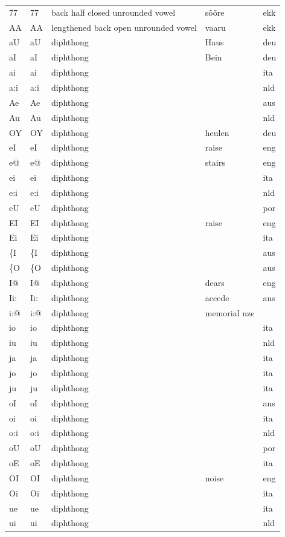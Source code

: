 \documentclass[twoside,a4paper]{book}
\begin{document}
\begin{longtable}{lllll}
	77 & 77 & back half closed unrounded vowel & sõõre & ekk\\
	AA & AA & lengthened back open unrounded vowel & vaaru & ekk\\
	aU & aU & diphthong & Haus & deu\\
	aI & aI & diphthong & Bein & deu\\
	ai & ai & diphthong & & ita\\
	a:i & a:i & diphthong & & nld\\
	Ae & Ae & diphthong & & aus\\
	Au & Au & diphthong & & nld\\
	OY & OY & diphthong & heulen & deu\\
	eI & eI & diphthong & raise & eng\\
	e@ & e@ & diphthong & stairs & eng\\
	ei & ei & diphthong & & ita\\
	e:i & e:i & diphthong & & nld\\
	eU & eU & diphthong & & por\\
	EI & EI & diphthong & raise & eng\\
	Ei & Ei & diphthong & & ita\\
	\{I & \{I & diphthong & & aus\\
	\{O & \{O & diphthong & & aus\\
	I@ & I@ & diphthong & dears & eng\\
	Ii: & Ii: & diphthong & accede & aus\\
	i:@ & i:@ & diphthong & memorial nze\\
	io & io & diphthong & & ita\\
	iu & iu & diphthong & & nld\\
	ja & ja & diphthong & & ita\\
	jo & jo & diphthong & & ita\\
	ju & ju & diphthong & & ita\\
	oI & oI & diphthong & & aus\\
	oi & oi & diphthong & & ita\\
	o:i & o:i & diphthong & & nld\\
	oU & oU & diphthong & & por\\
	oE & oE & diphthong & & ita\\
	OI & OI & diphthong & noise & eng\\
	Oi & Oi & diphthong & & ita\\
	ue & ue & diphthong & & ita\\
	ui & ui & diphthong & & nld\\

\end{longtable}
\end{document}
